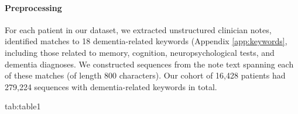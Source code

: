 \documentclass[pmlr,twocolumn,10pt]{jmlr} %
\begin{document}
\paragraph{Preprocessing}
\label{sec:Preprocessing} For each patient in our dataset, we extracted unstructured clinician notes, identified matches to 18 dementia-related keywords (Appendix \ref{app:keywords}, including those related to memory, cognition, neuropsychological tests, and dementia diagnoses. We constructed sequences from the note text spanning each of these matches (of length 800 characters). Our cohort of 16,428 patients had 279,224 sequences with dementia-related keywords in total.

\begin{table}[htb]
\floatconts
{tab:table1}
{\caption{Demographics of Data}}
\end{table}
\end{document}
